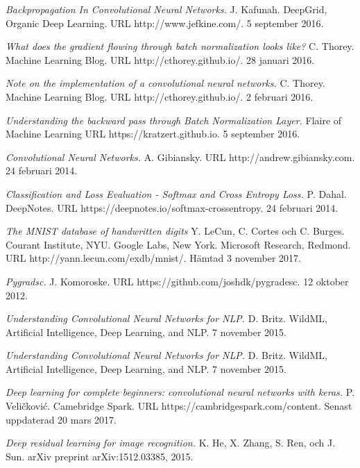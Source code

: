 \documentclass[a4paper,11pt,twoside]{article}
\begin{document}
\begin{thebibliography}{99}
	\textit{Backpropagation In Convolutional Neural Networks.}
	J. Kafunah.
    DeepGrid, Organic Deep Learning. 
    URL http://www.jefkine.com/.
	5 september 2016.

	\textit{What does the gradient flowing through batch normalization looks like?}
	C. Thorey.
    Machine Learning Blog. 
    URL http://cthorey.github.io/.
	28 januari 2016.
	
	\textit{Note on the implementation of a convolutional neural networks.}
	C. Thorey.
    Machine Learning Blog. 
    URL http://cthorey.github.io/.
	2 februari 2016.
	
	\textit{Understanding the backward pass through Batch Normalization Layer.}
	Flaire of Machine Learning
    URL https://kratzert.github.io.
	5 september 2016.
	
	\textit{Convolutional Neural Networks.}
	A. Gibiansky.
    URL http://andrew.gibiansky.com.
	24 februari 2014.
	
	\textit{Classification and Loss Evaluation - Softmax and Cross Entropy Loss.}
	P. Dahal. 
	DeepNotes.
    URL https://deepnotes.io/softmax-crossentropy.
	24 februari 2014.
	
	\textit{The MNIST database of handwritten digits}
	Y. LeCun, C. Cortes och C. Burges. Courant Institute, NYU. Google Labs, New York. Microsoft Research, Redmond. 
	URL http://yann.lecun.com/exdb/mnist/.
	Hämtad 3 november 2017.
	
	\textit{Pygradsc.}
	J. Komoroske.
	URL https://github.com/joshdk/pygradesc.
	12 oktober 2012.
	
	\textit{Understanding Convolutional Neural Networks for NLP.}
	D. Britz.
	WildML, Artificial Intelligence, Deep Learning, and NLP.
	7 november 2015.
	
	\textit{Understanding Convolutional Neural Networks for NLP.}
	D. Britz.
	WildML, Artificial Intelligence, Deep Learning, and NLP.
	7 november 2015.
	
	\textit{Deep learning for complete beginners: convolutional neural networks with keras.}
	P. Veličković.
	Camebridge Spark. 
	URL https://cambridgespark.com/content.
	Senast uppdaterad 20 mars 2017.


	\textit{Deep residual learning for image recognition.}
    K. He, X. Zhang, S. Ren, och J. Sun. 
    arXiv preprint arXiv:1512.03385, 2015.


\end{thebibliography}
\end{document}
